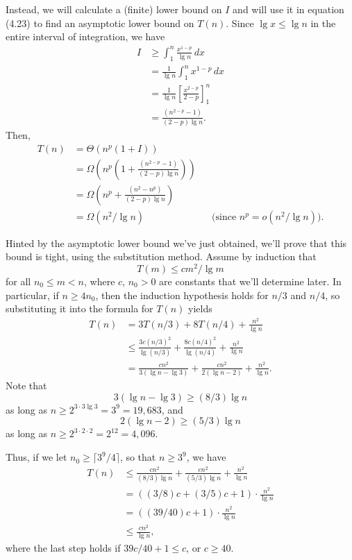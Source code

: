 Instead, we will calculate a (finite) lower bound on $I$ and will use it in equation (4.23) to find an asymptotic lower bound on $T(n)$.
Since $\lg x\le\lg n$ in the entire interval of integration, we have
\begin{align*}
    I &\ge \int_1^n\frac{x^{1-p}}{\lg n}\,dx \\[1mm]
    &= \frac{1}{\lg n}\int_1^nx^{1-p}\,dx \\[1mm]
    &= \frac{1}{\lg n}\left[\frac{x^{2-p}}{2-p}\right]_1^n \\[1mm]
    &= \frac{(n^{2-p}-1)}{(2-p)\lg n}.
\end{align*}
Then,
\begin{align*}
    T(n) &= \Theta(n^p(1+I)) \\
    &= \Omega\left(n^p\left(1+\frac{(n^{2-p}-1)}{(2-p)\lg n}\right)\right) \\
    &= \Omega\left(n^p+\frac{(n^2-n^p)}{(2-p)\lg n}\right) \\
    &= \Omega(n^2/\lg n) && \text{(since $n^p=o(n^2/\lg n)$)}.
\end{align*}

Hinted by the asymptotic lower bound we've just obtained, we'll prove that this bound is tight, using the substitution method.
Assume by induction that
\[
    T(m) \le cm^2/\lg m
\]
for all $n_0\le m<n$, where $c$, $n_0>0$ are constants that we'll determine later.
In particular, if $n\ge4n_0$, then the induction hypothesis holds for $n/3$ and $n/4$, so substituting it into the formula for $T(n)$ yields
\begin{align*}
    T(n) &= 3T(n/3)+8T(n/4)+\frac{n^2}{\lg n} \\
    &\le \frac{3c(n/3)^2}{\lg(n/3)}+\frac{8c(n/4)^2}{\lg(n/4)}+\frac{n^2}{\lg n} \\
    &= \frac{cn^2}{3(\lg n-\lg3)}+\frac{cn^2}{2(\lg n-2)}+\frac{n^2}{\lg n}.
\end{align*}
Note that
\[
    3(\lg n-\lg3) \ge (8/3)\lg n
\]
as long as $n\ge2^{3\cdot3\lg3}=3^9=19{,}683$, and
\[
    2(\lg n-2) \ge (5/3)\lg n
\]
as long as $n\ge2^{3\cdot2\cdot2}=2^{12}=4{,}096$.

Thus, if we let $n_0\ge\lceil3^9\!/4\rceil$, so that $n\ge3^9$, we have
\begin{align*}
    T(n) &\le \frac{cn^2}{(8/3)\lg n}+\frac{cn^2}{(5/3)\lg n}+\frac{n^2}{\lg n} \\
    &= ((3/8)c+(3/5)c+1)\cdot\frac{n^2}{\lg n} \\
    &= ((39/40)c+1)\cdot\frac{n^2}{\lg n} \\
    &\le \frac{cn^2}{\lg n},
\end{align*}
where the last step holds if $39c/40+1\le c$, or $c\ge40$.

